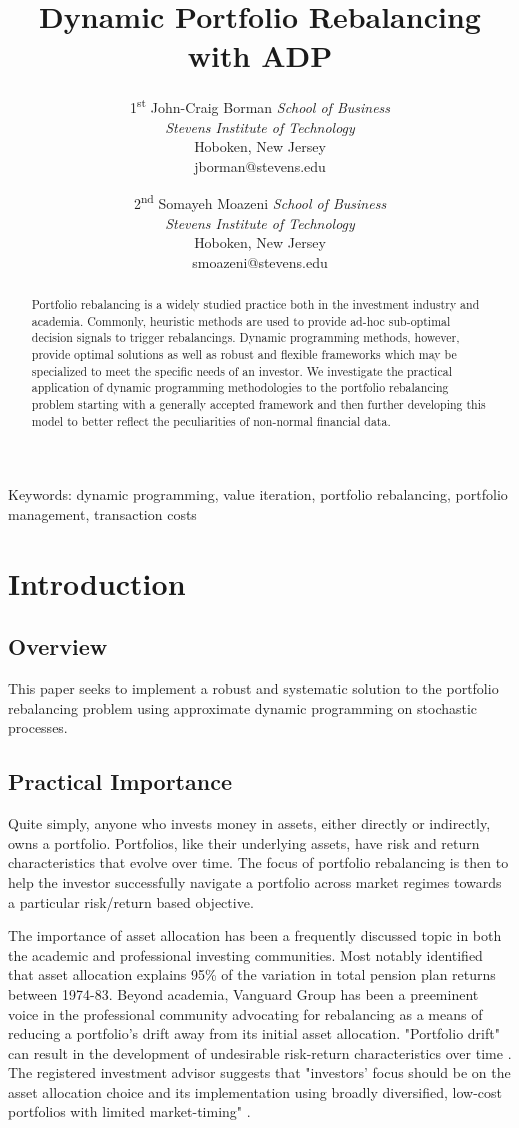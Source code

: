 \documentclass{article}
\title{Dynamic Portfolio Rebalancing with ADP}
\author{1\textsuperscript{st} John-Craig Borman
\textit{School of Business} \\
\textit{Stevens Institute of Technology}\\
Hoboken, New Jersey \\
jborman@stevens.edu
\and
{2\textsuperscript{nd} Somayeh Moazeni
\textit{School of Business} \\
\textit{Stevens Institute of Technology}\\
Hoboken, New Jersey \\
smoazeni@stevens.edu}
}
\begin{document}
\newcommand{\ssep}{:}

\maketitle

\begin{abstract}
Portfolio rebalancing is a widely studied practice both in the investment industry and academia. Commonly, heuristic methods are used to provide ad-hoc sub-optimal decision signals to trigger rebalancings. Dynamic programming methods, however, provide optimal solutions as well as robust and flexible frameworks which may be specialized to meet the specific needs of an investor.
We investigate the practical application of dynamic programming methodologies to the portfolio rebalancing problem starting with a generally accepted framework and then further developing this model to better reflect the peculiarities of non-normal financial data.
\end{abstract}


Keywords: dynamic programming, value iteration, portfolio rebalancing, portfolio management, transaction costs


\section{Introduction}

\subsection{Overview}

This paper seeks to implement a robust and systematic solution to the portfolio rebalancing problem using approximate dynamic programming on stochastic processes. 

\subsection{Practical Importance}

Quite simply, anyone who invests money in assets, either directly or indirectly, owns a portfolio. Portfolios, like their underlying assets, have risk and return characteristics that evolve over time. The focus of portfolio rebalancing is then to help the investor successfully navigate a portfolio across market regimes towards a particular risk/return based objective. 

The importance of asset allocation has been a frequently discussed topic in both the academic and professional investing communities. Most notably \cite{b3} identified that asset allocation explains 95\% of the variation in total pension plan returns between 1974-83. Beyond academia, Vanguard Group has been a preeminent voice in the professional community advocating for rebalancing as a means of reducing a portfolio's drift away from its initial asset allocation. "Portfolio drift" can result in the development of undesirable risk-return characteristics over time \cite{b1}. The registered investment advisor suggests that "investors’ focus should be on the asset allocation choice and its implementation using broadly diversified, low-cost portfolios with limited market-timing" \cite{b4}.
\end{document}
